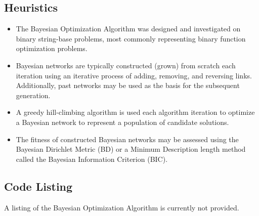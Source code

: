 \subsection{Heuristics}
\begin{itemize}
	\item The Bayesian Optimization Algorithm was designed and investigated on binary string-base problems, most commonly representing binary function optimization problems.
	\item Bayesian networks are typically constructed (grown) from scratch each iteration using an iterative process of adding, removing, and reversing links. Additionally, past networks may be used as the basis for the subsequent generation.
	\item A greedy hill-climbing algorithm is used each algorithm iteration to optimize a Bayesian network to represent a population of candidate solutions.
	\item The fitness of constructed Bayesian networks may be assessed using the Bayesian Dirichlet Metric (BD) or a Minimum Description length method called the Bayesian Information Criterion (BIC).
	
\end{itemize}

\subsection{Code Listing}
% 
% 
% 
A listing of the Bayesian Optimization Algorithm is currently not provided.

